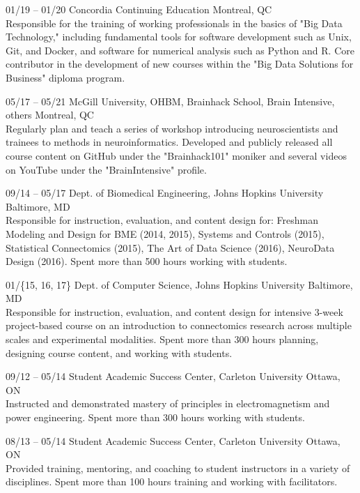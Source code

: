 \documentclass[]{friggeri-cv} %
\begin{document}
\begin{entrylist}
\entry
{01/19 -- 01/20}
{Concordia Continuing Education}
{Montreal, QC}
{ \\
Responsible for the training of working professionals in the basics of "Big Data Technology," including fundamental
tools for software development such as Unix, Git, and Docker, and software for numerical analysis such as Python and R.
Core contributor in the development of new courses within the "Big Data Solutions for Business" diploma program.}

\entry
{05/17 -- 05/21}
{McGill University, OHBM, Brainhack School, Brain Intensive, others}
{Montreal, QC}
{ \\
Regularly plan and teach a series of workshop introducing neuroscientists and trainees to methods in neuroinformatics.
Developed and publicly released all course content on GitHub under the "Brainhack101" moniker and several videos on
YouTube under the "BrainIntensive" profile.}

\entry
{09/14 -- 05/17}
{Dept. of Biomedical Engineering, Johns Hopkins University}
{Baltimore, MD}
{ \\
Responsible for instruction, evaluation, and content design for: Freshman Modeling and Design
for BME (2014, 2015), Systems and Controls (2015), Statistical Connectomics (2015), The Art of
Data Science (2016), NeuroData Design (2016). Spent more than 500 hours working with students.}

\entry
{01/\{15, 16, 17\}}
{Dept. of Computer Science, Johns Hopkins University}
{Baltimore, MD}
{\\
Responsible for instruction, evaluation, and content design for intensive 3-week project-based course on an
introduction to connectomics research across multiple scales and experimental modalities. Spent more than 300 hours
planning, designing course content, and working with students.}

\entry
{09/12 -- 05/14}
{Student Academic Success Center, Carleton University}
{Ottawa, ON}
{\\
Instructed and demonstrated mastery of principles in electromagnetism and power engineering. Spent more than 300 hours
working with students.}

\entry
{08/13 -- 05/14}
{Student Academic Success Center, Carleton University}
{Ottawa, ON}
{\\
Provided training, mentoring, and coaching to student instructors in a variety of disciplines. Spent more than 100
hours training and working with facilitators.}

\end{entrylist}
\end{document}
